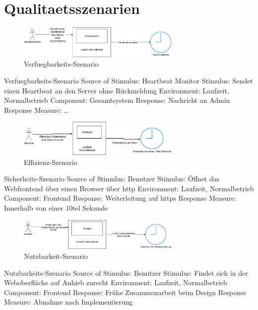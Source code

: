 \chapter{Qualitaetsszenarien}
\label{ch:Qualitaetsszenarien}


\begin{figure}[tbh]
  \centering
  \includegraphics[width=0.7\textwidth]{Graphics/Verfuegbarkeit.png}
  \caption{Verfuegbarkeits-Szenario}
  \label{fig:Qualitaet1}
\end{figure}

Verfuegbarkeits-Szenario
Source of Stimulus: Heartbeat Monitor
Stimulus: Sendet einen Heartbeat an den Server ohne Rückmeldung
Environment: Laufzeit, Normalbetrieb
Component: Gesamtsystem
Response: Nachricht an Admin
Response Measure: …




\begin{figure}[tbh]
  \centering
  \includegraphics[width=0.7\textwidth]{Graphics/Sicherheit.png}
  \caption{Effizienz-Szenario}
  \label{fig:Qualitaet2}
\end{figure}


Sicherheits-Szenario
Source of Stimulus: Benutzer
Stimulus: Öffnet das Webfrontend über einen Browser über http
Environment: Laufzeit, Normalbetrieb
Component: Frontend
Response: Weiterleitung auf https
Response Measure: Innerhalb von einer 10tel Sekunde




\begin{figure}[tbh]
  \centering
  \includegraphics[width=0.7\textwidth]{Graphics/Nutzbarkeit.png}
  \caption{Nutzbarkeit-Szenario}
  \label{fig:Qualitaet3}
\end{figure}



Nutzbarkeits-Szenario
Source of Stimulus: Benutzer
Stimulus: Findet sich in der Weboberfläche auf Anhieb zurecht
Environment: Laufzeit, Normalbetrieb
Component: Frontend
Response: Frühe Zusammenarbeit beim Design
Response Measure: Abnahme nach Implementierung





